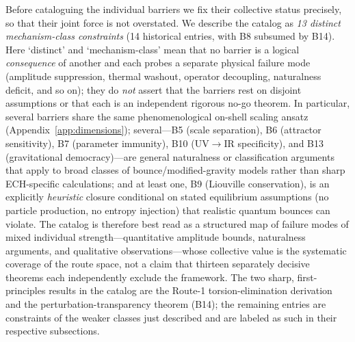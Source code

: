 \documentclass[aps,prd,twocolumn,superscriptaddress,showpacs,preprintnumbers,nofootinbib,longbibliography,floatfix]{revtex4-2}
\begin{document}
Before cataloguing the individual barriers we fix their collective status
precisely, so that their joint force is not overstated. We describe the catalog
as \emph{13 distinct mechanism-class constraints} (14 historical entries, with
B8 subsumed by B14). Here `distinct' and `mechanism-class' mean that no barrier
is a logical \emph{consequence} of another and each probes a separate physical
failure mode (amplitude suppression, thermal washout, operator decoupling,
naturalness deficit, and so on); they do \emph{not} assert that the barriers
rest on disjoint assumptions or that each is an independent rigorous no-go
theorem. In particular, several barriers share the same phenomenological
on-shell scaling ansatz (Appendix~\ref{app:dimensions}); several---B5 (scale
separation), B6 (attractor sensitivity), B7 (parameter immunity), B10
(UV$\to$IR specificity), and B13 (gravitational democracy)---are general
naturalness or classification arguments that apply to broad classes of
bounce/modified-gravity models rather than sharp ECH-specific calculations;
and at least one, B9 (Liouville conservation), is an explicitly \emph{heuristic}
closure conditional on stated equilibrium assumptions (no particle production,
no entropy injection) that realistic quantum bounces can violate. The catalog
is therefore best read as a structured map of failure modes of mixed individual
strength---quantitative amplitude bounds, naturalness arguments, and qualitative
observations---whose collective value is the systematic coverage of the route
space, not a claim that thirteen separately decisive theorems each independently
exclude the framework. The two sharp, first-principles results in the catalog
are the Route-1 torsion-elimination derivation and the perturbation-transparency
theorem (B14); the remaining entries are constraints of the weaker classes just
described and are labeled as such in their respective subsections.
\end{document}
